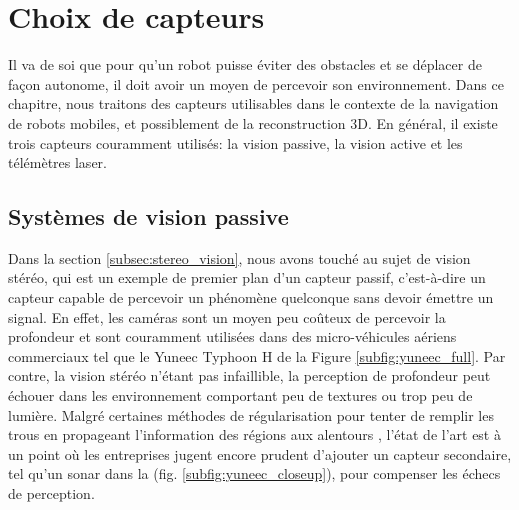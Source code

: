 \section{Choix de capteurs}\label{sec:capteurs}

Il va de soi que pour qu'un robot puisse éviter des obstacles et se déplacer de façon autonome, il doit avoir un moyen de percevoir son environnement. Dans ce chapitre, nous traitons des capteurs utilisables dans le contexte de la navigation de robots mobiles, et possiblement de la reconstruction 3D. En général, il existe trois capteurs couramment utilisés: la vision passive, la vision active et les télémètres laser.

\subsection{Systèmes de vision passive}

Dans la section \ref{subsec:stereo_vision}, nous avons touché au sujet de vision stéréo, qui est un exemple de premier plan d'un capteur passif, c'est-à-dire un capteur capable de percevoir un phénomène quelconque sans devoir émettre un signal. En effet, les caméras sont un moyen peu coûteux de percevoir la profondeur et sont couramment utilisées dans des micro-véhicules aériens commerciaux tel que le Yuneec Typhoon H de la Figure \ref{subfig:yuneec_full}. Par contre, la vision stéréo n'étant pas infaillible, la perception de profondeur peut échouer dans les environnement comportant peu de textures ou trop peu de lumière. Malgré certaines méthodes de régularisation pour tenter de remplir les trous en propageant l'information des régions aux alentours \citep{Hirschmuller2008}, l'état de l'art est à un point où les entreprises jugent encore prudent d'ajouter un capteur secondaire, tel qu'un sonar dans la (fig. \ref{subfig:yuneec_closeup}), pour compenser les échecs de perception.


